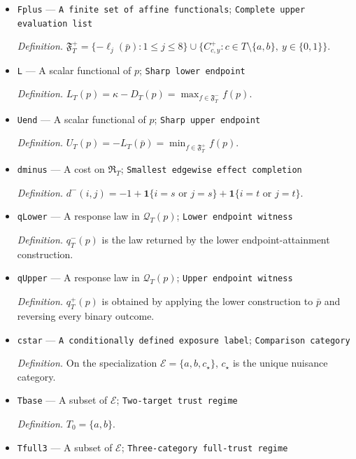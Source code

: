 \documentclass{article}
\begin{document}
\begin{itemize}
  \par\smallskip\noindent\emph{Definition.} \(\mathfrak F^-_T=\{\ell_1,\ldots,\ell_8\}\cup\{C^-_{c,y}:c\in T\setminus\{a,b\},\ y\in\{0,1\}\}\).
  \item \texttt{Fplus} --- \texttt{A finite set of affine functionals}; \texttt{Complete upper evaluation list}
  \par\smallskip\noindent\emph{Definition.} \(\mathfrak F^+_T=\{-\ell_j(\bar p):1\leq j\leq 8\}\cup\{C^+_{c,y}:c\in T\setminus\{a,b\},\ y\in\{0,1\}\}\).
  \item \texttt{L} --- A scalar functional of \(p\); \texttt{Sharp lower endpoint}
  \par\smallskip\noindent\emph{Definition.} \(L_T(p)=\kappa-D_T(p)=\max_{f\in\mathfrak F^-_T}f(p)\).
  \item \texttt{Uend} --- A scalar functional of \(p\); \texttt{Sharp upper endpoint}
  \par\smallskip\noindent\emph{Definition.} \(U_T(p)=-L_T(\bar p)=\min_{f\in\mathfrak F^+_T}f(p)\).
  \item \texttt{dminus} --- A cost on \(\mathfrak R_T\); \texttt{Smallest edgewise effect completion}
  \par\smallskip\noindent\emph{Definition.} \(d^-(i,j)=-1+\mathbf 1\{i=s\text{ or }j=s\}+\mathbf 1\{i=t\text{ or }j=t\}\).
  \item \texttt{qLower} --- A response law in \(\mathcal Q_T(p)\); \texttt{Lower endpoint witness}
  \par\smallskip\noindent\emph{Definition.} \(q^-_T(p)\) is the law returned by the lower endpoint-attainment construction.
  \item \texttt{qUpper} --- A response law in \(\mathcal Q_T(p)\); \texttt{Upper endpoint witness}
  \par\smallskip\noindent\emph{Definition.} \(q^+_T(p)\) is obtained by applying the lower construction to \(\bar p\) and reversing every binary outcome.
  \item \texttt{cstar} --- \texttt{A conditionally defined exposure label}; \texttt{Comparison category}
  \par\smallskip\noindent\emph{Definition.} On the specialization \(\mathcal E=\{a,b,c_\star\}\), \(c_\star\) is the unique nuisance category.
  \item \texttt{Tbase} --- A subset of \(\mathcal E\); \texttt{Two-\allowbreak{}target trust regime}
  \par\smallskip\noindent\emph{Definition.} \(T_0=\{a,b\}\).
  \item \texttt{Tfull3} --- A subset of \(\mathcal E\); \texttt{Three-\allowbreak{}category full-\allowbreak{}trust regime}

\end{itemize}
\end{document}
